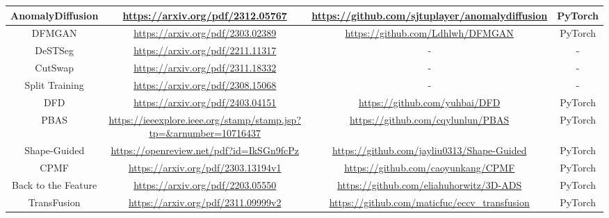 \documentclass[journal,comsoc]{IEEEtran}
\begin{document}
\begin{appendices}
\begin{table*}
{\begin{tabular}{|c|c|c|c|}
     AnomalyDiffusion \cite{hu2024anomalydiffusion}& \href{https://arxiv.org/pdf/2312.05767}{https://arxiv.org/pdf/2312.05767}& \href{https://github.com/sjtuplayer/anomalydiffusion}{https://github.com/sjtuplayer/anomalydiffusion}&PyTorch\\\hline
     DFMGAN \cite{duan2023dfmgan}& \href{https://arxiv.org/pdf/2303.02389}{https://arxiv.org/pdf/2303.02389}& \href{https://github.com/Ldhlwh/DFMGAN}{https://github.com/Ldhlwh/DFMGAN}&PyTorch\\\hline
     DeSTSeg \cite{zhang2023destseg}& \href{https://arxiv.org/pdf/2211.11317}{https://arxiv.org/pdf/2211.11317}& -&-\\\hline
     CutSwap \cite{qin2024cutswap}& \href{https://arxiv.org/pdf/2311.18332}{https://arxiv.org/pdf/2311.18332}& -&-\\\hline
     Split Training \cite{lin2024split}& \href{https://arxiv.org/pdf/2308.15068}{https://arxiv.org/pdf/2308.15068}& -&-\\\hline
     DFD \cite{bai2024dfd}& \href{https://arxiv.org/pdf/2403.04151}{https://arxiv.org/pdf/2403.04151}& \href{https://github.com/yuhbai/DFD}{https://github.com/yuhbai/DFD}&PyTorch\\\hline
     PBAS \cite{chen2024pbas}& \href{https://ieeexplore.ieee.org/stamp/stamp.jsp?tp=\&arnumber=10716437}{https://ieeexplore.ieee.org/stamp/stamp.jsp?tp=\&arnumber=10716437}& \href{https://github.com/cqylunlun/PBAS}{https://github.com/cqylunlun/PBAS}&PyTorch\\\hline
    Shape-Guided \cite{chu2023shape}&  \href{https://openreview.net/pdf?id=IkSGn9fcPz}{https://openreview.net/pdf?id=IkSGn9fcPz}&  \href{https://github.com/jayliu0313/Shape-Guided}{https://github.com/jayliu0313/Shape-Guided}& PyTorch\\ \hline 
    CPMF \cite{cao2024cpmf}&  \href{https://arxiv.org/pdf/2303.13194v1}{https://arxiv.org/pdf/2303.13194v1}&  \href{https://github.com/caoyunkang/CPMF}{https://github.com/caoyunkang/CPMF}& PyTorch\\ \hline 
    Back to the Feature \cite{horwitz2023back}&  \href{https://arxiv.org/pdf/2203.05550}{https://arxiv.org/pdf/2203.05550}&  \href{https://github.com/eliahuhorwitz/3D-ADS}{https://github.com/eliahuhorwitz/3D-ADS}& PyTorch\\ \hline 
    TransFusion \cite{fuvcka2025transfusion}&  \href{https://arxiv.org/pdf/2311.09999v2}{https://arxiv.org/pdf/2311.09999v2}&  \href{https://github.com/maticfuc/eccv_transfusion}{https://github.com/maticfuc/eccv\_transfusion}& PyTorch\\ \hline 

\end{tabular}}
\end{table*}
\end{appendices}
\end{document}
